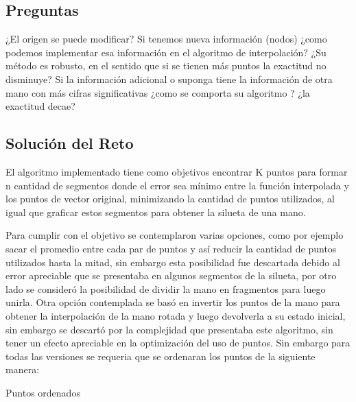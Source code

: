 \documentclass[]{article}
\begin{document}
\subsection{Preguntas}\label{preguntas}

¿El origen se puede modificar? Si tenemos nueva información (nodos)
¿como podemos implementar esa información en el algoritmo de
interpolación? ¿Su método es robusto, en el sentido que si se tienen más
puntos la exactitud no disminuye? Si la información adicional o suponga
tiene la información de otra mano con más cifras significativas ¿como se
comporta su algoritmo ? ¿la exactitud decae?

\subsection{Solución del Reto}\label{solucion-del-reto}

El algoritmo implementado tiene como objetivos encontrar K puntos para
formar n cantidad de segmentos donde el error sea mínimo entre la
función interpolada y los puntos de vector original, minimizando la
cantidad de puntos utilizados, al igual que graficar estos segmentos
para obtener la silueta de una mano.

Para cumplir con el objetivo se contemplaron varias opciones, como por
ejemplo sacar el promedio entre cada par de puntos y así reducir la
cantidad de puntos utilizados hasta la mitad, sin embargo esta
posibilidad fue descartada debido al error apreciable que se presentaba
en algunos segmentos de la silueta, por otro lado se consideró la
posibilidad de dividir la mano en fragmentos para luego unirla. Otra
opción contemplada se basó en invertir los puntos de la mano para
obtener la interpolación de la mano rotada y luego devolverla a su
estado inicial, sin embargo se descartó por la complejidad que
presentaba este algoritmo, sin tener un efecto apreciable en la
optimización del uso de puntos. Sin embargo para todas las versiones se
requeria que se ordenaran los puntos de la siguiente manera:

Puntos ordenados
\end{document}
